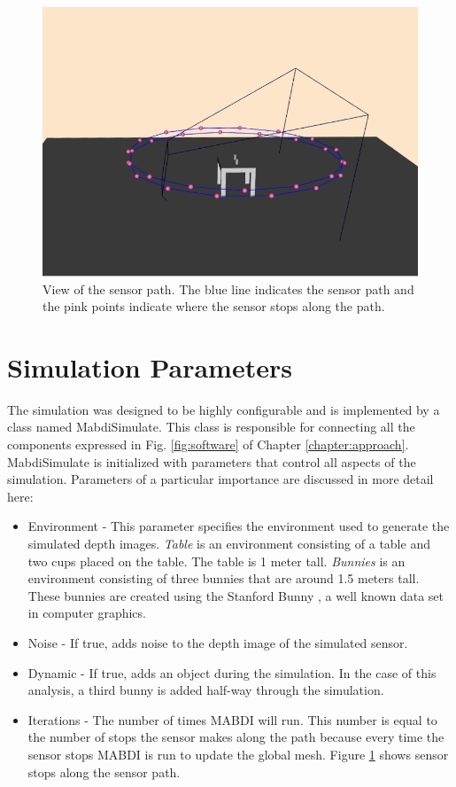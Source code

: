 \begin{figure}[h]%
\centering
  \includegraphics[width=.70\textwidth]{figures/expsetup_path.png}
  \caption{View of the sensor path. The blue line indicates the sensor path and the pink points indicate where the sensor stops along the path.}
  \label{fig:sensor_path}
\end{figure}

\section{Simulation Parameters}

The simulation was designed to be highly configurable and is implemented by a
class named MabdiSimulate. This class is responsible for connecting all the
components expressed in Fig. \ref{fig:software} of Chapter
\ref{chapter:approach}. MabdiSimulate is initialized with parameters that
control all aspects of the simulation. Parameters of a particular importance are
discussed in more detail here:

\begin{itemize}
    \item Environment - This parameter specifies the environment used to generate
    the simulated depth images. \textit{Table} is an environment consisting of a
    table and two cups placed on the table. The table is 1 meter tall.
    \textit{Bunnies} is an environment consisting of three bunnies that are
    around 1.5 meters tall. These bunnies are created using the Stanford Bunny
    \cite{Turk1994}, a well known data set in computer graphics.
    \item Noise - If true, adds noise to the depth image of the simulated sensor.
    \item Dynamic - If true, adds an object during the simulation. In the case
    of this analysis, a third bunny is added half-way through the simulation.
    \item Iterations - The number of times MABDI will run. This number is equal to the number of stops the sensor makes along the path because every time the sensor stops MABDI is run to update the global mesh. Figure \ref{fig:sensor_path} shows sensor stops along the sensor path.
\end{itemize}

